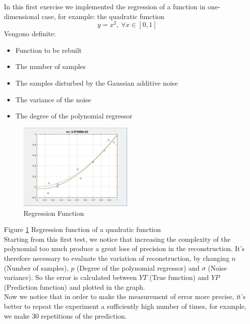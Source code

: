 
In this first exercise we implemented the regression of a function in one-dimensional case, for example: the quadratic function
\[y = x^2,\  \forall x\in[0,1]\]
Vengono definite:

\begin{itemize}

	\item Function to be rebuilt
	\item The number of samples
	\item The samples disturbed by the Gaussian additive noise
	\item The variance of the noise
	\item The degree of the polynomial regressor

\end{itemize}

\begin{figure}[h]
	\centering
	\includegraphics[width=0.5\textwidth]{regression_function.png}
	\caption{Regression Function}
	\label{fig:regression function}
\end{figure}

Figure \ref{fig:regression function} Regression function of a quadratic function\\
Starting from this first test, we notice that increasing the complexity of the polynomial too much produce a great loss of precision in the reconstruction.
It's therefore necessary to evaluate the variation of reconstruction, by changing $ n $ (Number of samples), $ p $ (Degree of the polynomial regressor) and $ \sigma $ (Noise variance).
So the error is calculated between $ YT $ (True function) and $ YP $ (Prediction function) and plotted in the graph. \\
Now we notice that in order to make the measurement of error more precise, it's better to repeat the experiment a sufficiently high number of times, for example, we make 30 repetitions of the prediction.

